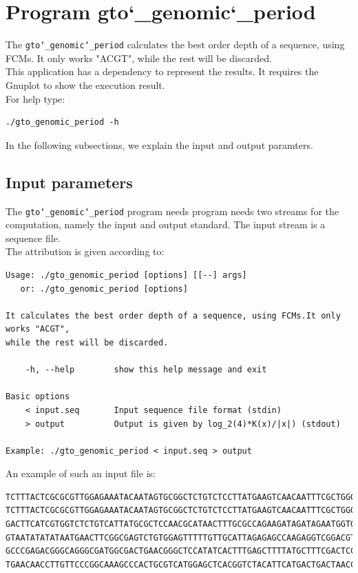 \section{Program gto\char`_genomic\char`_period}
The \texttt{gto\char`_genomic\char`_period} calculates the best order depth of a sequence, using FCMs. It only works "ACGT", while the rest will be discarded.\\
This application has a dependency to represent the results. It requires the Gnuplot to show the execution result.\\
For help type:
\begin{lstlisting}
./gto_genomic_period -h
\end{lstlisting}
In the following subsections, we explain the input and output paramters.

\subsection*{Input parameters}

The \texttt{gto\char`_genomic\char`_period} program needs program needs two streams for the computation, namely the input and output standard. The input stream is a sequence file.\\
The attribution is given according to:
\begin{lstlisting}
Usage: ./gto_genomic_period [options] [[--] args]
   or: ./gto_genomic_period [options]

It calculates the best order depth of a sequence, using FCMs.It only works "ACGT", 
while the rest will be discarded.

    -h, --help        show this help message and exit

Basic options
    < input.seq       Input sequence file format (stdin)
    > output          Output is given by log_2(4)*K(x)/|x|) (stdout)

Example: ./gto_genomic_period < input.seq > output
\end{lstlisting}
An example of such an input file is:
\begin{lstlisting}
TCTTTACTCGCGCGTTGGAGAAATACAATAGTGCGGCTCTGTCTCCTTATGAAGTCAACAATTTCGCTGGGACTTGCGGC
TCTTTACTCGCGCGTTGGAGAAATACAATAGTGCGGCTCTGTCTCCTTATGAAGTCAACAATTTCGCTGGGACTTGCGGC
GACTTCATCGTGGTCTCTGTCATTATGCGCTCCAACGCATAACTTTGCGCCAGAAGATAGATAGAATGGTGTAAGAAACT
GTAATATATATAATGAACTTCGGCGAGTCTGTGGAGTTTTTGTTGCATTAGAGAGCCAAGAGGTCGGACGTCCTCACGTA
GCCCGAGACGGGCAGGGCGATGGCGACTGAACGGGCTCCATATCACTTTGAGCTTTTATGCTTTCGACTCCTCCAGGAGC
TGAACAACCTTGTTCCCGGCAAAGCCCACTGCGTCATGGAGCTCACGGTCTACATTCATGACTGACTAACCGTAAACTGC
\end{lstlisting}


